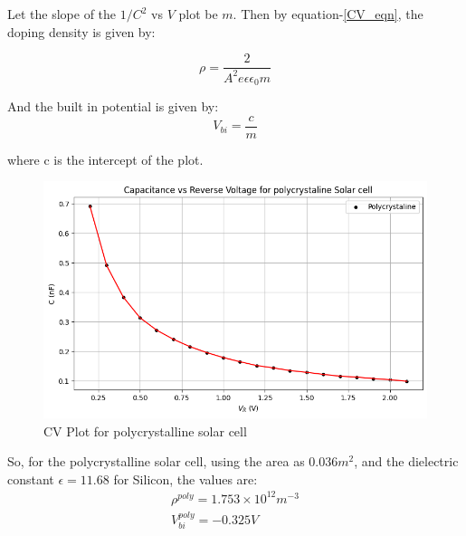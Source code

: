 \documentclass{article}
\begin{document}
\begin{multicols}{2}
\begin{table}[H]
    \centering
    \caption{Linear fitted parameters for mono and poly crystalline solar cells}
    \label{CV_slope_table}
\end{table}


Let the slope of the $1/C^2$ vs $V$ plot be $m$. Then by equation-\ref{CV_eqn}, the doping density is given by:

\begin{equation}
    \rho = \frac{2}{A^2e\epsilon \epsilon_0 m}
\end{equation}

And the built in potential is given by:
\begin{equation}
    V_{bi} = \frac{c}{m}
\end{equation}

where c is the intercept of the plot.

\begin{figure}[H]
    \centering
    \includegraphics[width=\columnwidth]{Images/CV_poly_1.png}
    \caption{CV Plot for polycrystalline solar cell}
    \label{CV_poly_1}
\end{figure}
So, for the polycrystalline solar cell, using the area as $0.036 m^2$, and the dielectric constant $\epsilon=11.68$ for Silicon, the values are:
\begin{eqnarray}
    \rho^{poly} = 1.753 \times 10^{12} m^{-3} \\
    V_{bi}^{poly} = -0.325 V
\end{eqnarray}


\end{multicols}
\end{document}
